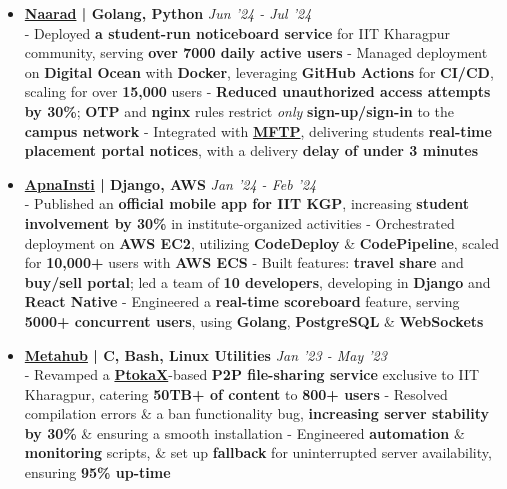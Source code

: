 \documentclass[a4paper,10pt]{extarticle} %
\begin{document}
\begin{itemize}[leftmargin=0.55cm, rightmargin=0.2cm, label={\Large\textbullet}]

 \item \textbf{\href{https://naarad.metakgp.org}{Naarad} | Golang, Python} \hfill{\textit{Jun '24 - Jul '24}} \\
- Deployed \textbf{a student-run noticeboard service} for IIT Kharagpur community, serving \textbf{over 7000 daily active users} \newline
- Managed deployment on \textbf{Digital Ocean} with \textbf{Docker}, leveraging \textbf{GitHub Actions} for \textbf{CI/CD}, scaling for over \textbf{15,000} users \newline
- \textbf{Reduced unauthorized access attempts by 30\%}; \textbf{OTP} and \textbf{nginx} rules restrict \textit{only} \textbf{sign-up/sign-in} to the \textbf{campus network}  \newline
- Integrated with \href{https://github.com/metakgp/mftp}{\textbf{MFTP}}, delivering students \textbf{real-time placement portal notices}, with a delivery \textbf{delay of under 3 minutes}

 \item \textbf{{\href{https://play.google.com/store/apps/details?id=com.apnainsti&pli=1}{ApnaInsti}} | Django, AWS} \hfill{\textit{Jan '24 - Feb '24}} \\
- Published an \textbf{official mobile app for IIT KGP}, increasing \textbf{student involvement by 30\%} in institute-organized activities \newline
- Orchestrated deployment on \textbf{AWS EC2}, utilizing \textbf{CodeDeploy} \& \textbf{CodePipeline}, scaled for \textbf{10,000+} users with \textbf{AWS ECS} \newline
- Built features: \textbf{travel share} and \textbf{buy/sell portal}; led a team of \textbf{10 developers}, developing in \textbf{Django} and \textbf{React Native} \newline
- Engineered a \textbf{real-time scoreboard} feature, serving \textbf{5000+ concurrent users}, using \textbf{Golang}, \textbf{PostgreSQL} \& \textbf{WebSockets}

\item \textbf{{\href{https://github.com/proffapt/Metahub}{Metahub}} | C, Bash, Linux Utilities} \hfill{\textit{Jan '23 - May '23}} \\
- Revamped a \href{http://www.ptokax.org/}{\textbf{PtokaX}}-based \textbf{P2P file-sharing service} exclusive to IIT Kharagpur, catering \textbf{50TB+ of content} to \textbf{800+ users} \newline
- Resolved compilation errors \& a ban functionality bug, \textbf{increasing server stability by 30\%} \& ensuring a smooth installation \newline
- Engineered \textbf{automation} \& \textbf{monitoring} scripts, \& set up \textbf{fallback} for uninterrupted server availability, ensuring \textbf{95\% up-time}


\end{itemize}
\end{document}
